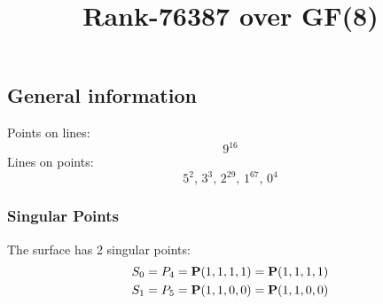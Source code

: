 \documentclass{article}
\newcommand\setTBstruts{\def\T{\rule{0pt}{2.6ex}}%
\def\B{\rule[-1.2ex]{0pt}{0pt}}}
\newcommand{\bP}{{\bf P}}
\begin{document}
 
\setTBstruts



{\allowdisplaybreaks%






\title{Rank-76387 over GF(8)}
\author{}%
\maketitle%
%
{}



\subsection*{General information}
Points on lines:
$$
9^{16}$$
Lines on points:
$$
5^2,\,3^3,\,2^{29},\,1^{67},\,0^4$$
\subsubsection*{Singular Points}
The surface has 2 singular points:\\
\begin{align*}
S_{0} &= P_{4}=\bP(1, 1, 1, 1) = \bP(1, 1, 1, 1)\\
S_{1} &= P_{5}=\bP(1, 1, 0, 0) = \bP(1, 1, 0, 0)\\
\end{align*}
}
\end{document}
